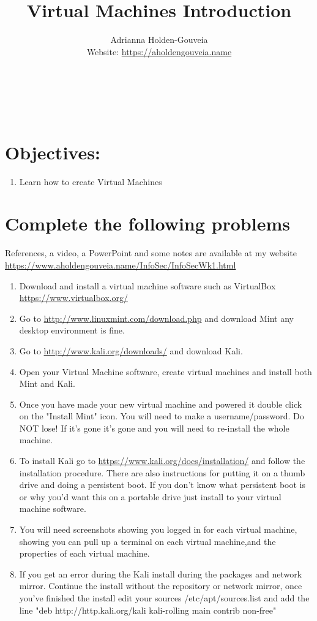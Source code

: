 \documentclass[12pt]{article}
\title{Virtual Machines Introduction}
\author{
        Adrianna Holden-Gouveia \\
        Website: \url{https://aholdengouveia.name}\\ 
        \date{\vspace{-5ex}}
        \faLinkedin{: aholdengouveia} \\
        \faGithub {: aholdengouveia} \\
        \faTwitter {: aholdengouveia} \\
        }
\begin{document}
    

\maketitle


\section*{Objectives:}
\begin{enumerate}
    \item Learn how to create Virtual Machines
\end{enumerate}
\section*{Complete the following problems}

References, a video, a PowerPoint and some notes are available at my website
\url {https://www.aholdengouveia.name/InfoSec/InfoSecWk1.html}
\begin{enumerate}
    \item Download and install a virtual machine software such as VirtualBox \url {https://www.virtualbox.org/}
    \item Go to  \url{http://www.linuxmint.com/download.php} and download Mint  any desktop environment is fine.
    \item Go to \url{http://www.kali.org/downloads/}   and download Kali.
    \item Open your Virtual Machine software, create virtual machines and install both Mint and Kali.
    \item Once you have made your new virtual machine and powered it double click on the "Install Mint" icon.  You will need to make a username/password. Do NOT lose! If it's gone it's gone and you will need to re-install the whole machine.
    \item To install Kali go to \url{https://www.kali.org/docs/installation/} and follow the installation procedure.  There are also instructions for putting it on a thumb drive and doing a persistent boot.  If you don't know what persistent boot is or why you'd want this on a portable drive just install to your virtual machine software.
    \item You will need screenshots showing you logged in for each virtual machine, showing you can pull up a terminal on each virtual machine,and the properties of each virtual machine.
    \item If you get an error during the Kali install during the packages and network mirror. Continue the install without the repository or network mirror, once you've finished the install edit your sources /etc/apt/sources.list and add the line "deb http://http.kali.org/kali kali-rolling main contrib non-free"  

\end{enumerate}
\end{document}
